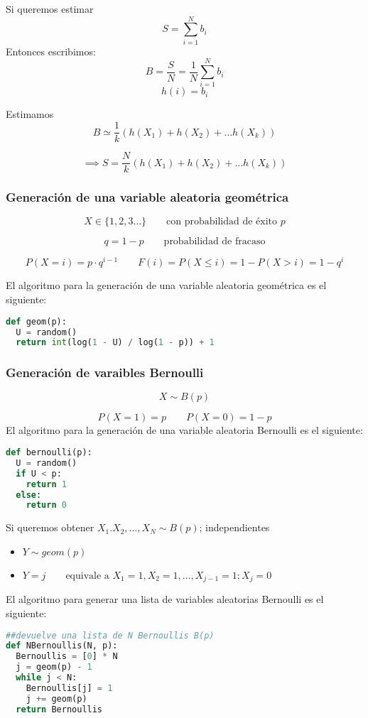 \documentclass[11pt, a4paper]{article}
\theoremstyle{definition}
\begin{document}
Si queremos estimar 
\[
S = \sum_{i=1}^{N} b_i
\]
Entonces escribimos:
\[
B = \frac{S}{N} = \frac{1}{N} \sum_{i=1}^{N} b_i 
\]
\[
h(i) = b_i
\]

Estimamos 
\[B \simeq \frac{1}{k} (h(X_1) + h(X_2) + \ldots h(X_k))\]

\[
\implies S = \frac{N}{k} (h(X_1) + h(X_2) + \ldots h(X_k))
\]
\newpage

\subsubsection{Generación de una variable aleatoria geométrica}

\[
X \in \{1, 2, 3 \ldots\} \qquad \text{con probabilidad de éxito } p 
\]

\[
q = 1 - p \qquad \text{probabilidad de fracaso} 
\]

\[
P(X = i) = p \cdot q^{i-1} \qquad F(i) = P(X \leq i) = 1 - P(X > i) = 1 - q^i
\]

El algoritmo para la generación de una variable aleatoria geométrica es el siguiente:
\begin{lstlisting}[language=Python]
def geom(p):
  U = random()
  return int(log(1 - U) / log(1 - p)) + 1
\end{lstlisting}

\subsubsection{Generación de varaibles Bernoulli}
\[
X \sim B(p)
\]

\[
P(X = 1) = p \qquad P(X = 0) = 1 - p
\]
El algoritmo para la generación de una variable aleatoria Bernoulli es el siguiente:
\begin{lstlisting}[language=Python]
def bernoulli(p):
  U = random()
  if U < p:
    return 1
  else:
    return 0
\end{lstlisting}
Si queremos obtener $X_1. X_2, \ldots, X_N \sim B(p)$; independientes
\begin{itemize}
  \item $Y \sim geom(p)$
  \item $Y = j \qquad \text{equivale a } X_1 = 1, X_2 = 1, \ldots, X_{j-1} = 1; X_j = 0 $
\end{itemize}

El algoritmo para generar una lista de variables aleatorias Bernoulli es el siguiente:
\begin{lstlisting}[language=Python]
##devuelve una lista de N Bernoullis B(p)
def NBernoullis(N, p):
  Bernoullis = [0] * N
  j = geom(p) - 1
  while j < N:
    Bernoullis[j] = 1
    j += geom(p)
  return Bernoullis
\end{lstlisting}
\end{document}
